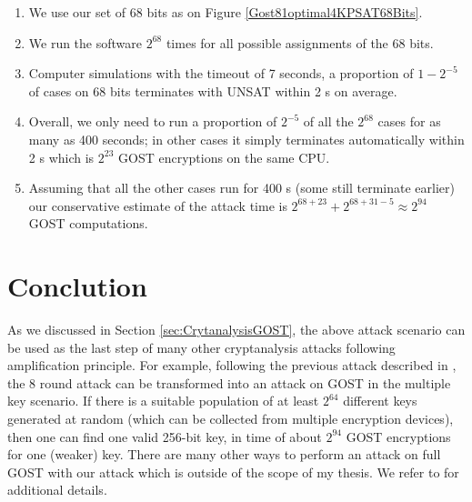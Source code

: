 \begin{enumerate}
	\item
	We use our set of 68 bits as
	on Figure \ref{Gost81optimal4KPSAT68Bits}. %
	\item
	We run the software $2^{68}$ times for all possible assignments of the 68 bits.
	\item
	Computer simulations
	with the timeout of 7 seconds,
	a proportion of $1-2^{-5}$ of cases on 68 bits terminates with UNSAT
	within 2 s on average.
	\item
	Overall, we only need to run a proportion of $2^{-5}$ of all the $2^{68}$ cases
	for as many as 400 seconds;
	in other cases it simply terminates automatically within 2 s
	which is $2^{23}$ GOST encryptions on the same CPU.
	\item
	Assuming that all the other cases run for 400 s (some still terminate earlier)
	our conservative estimate of the attack time is
	$2^{68+23}+2^{68+31-5}\approx 2^{94}$ GOST computations.
\end{enumerate}

\section{Conclution}
As we discussed in Section \ref{sec:CrytanalysisGOST}, the above attack scenario can be used as  the last step of many other cryptanalysis attacks following amplification principle. For example, following the previous attack described in \cite{gostlow8r}, the 8 round attack can be transformed into an attack on GOST in the multiple key scenario. If there is a suitable %
population of at least $2^{64}$ different keys generated at random (which can be collected from multiple encryption devices), then one can find one valid 256-bit key, in time of about $2^{94}$ GOST encryptions for one (weaker) key. There are many other ways to perform an attack on full GOST with our attack which is outside of the scope of my thesis. We refer to \cite{gostreport,gostlow8r,gostac} for additional details.

